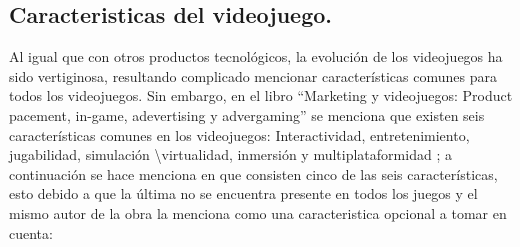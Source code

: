 	\subsection{Caracteristicas del videojuego.}\label{CaracVideojuego}
	Al igual que con otros productos tecnológicos, la evolución de los videojuegos 
	ha sido vertiginosa, resultando complicado mencionar características comunes 
	para todos los videojuegos. Sin embargo, en el libro “Marketing y videojuegos: 
	Product pacement, in-game, adevertising y advergaming” se menciona que existen seis 
	características comunes en los videojuegos: Interactividad, entretenimiento, 
	jugabilidad, simulación \textbackslash virtualidad, inmersión y multiplataformidad 
	\cite{RefCarac}; a continuación se hace menciona en que consisten cinco de las seis 
	características, esto debido a que la última no se encuentra presente en todos los 
	juegos y el mismo autor de la obra la menciona como una caracteristica opcional a 
	tomar en cuenta:
